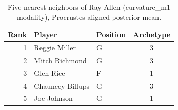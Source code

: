 \begin{table}[htbp]
  \centering\small
  \begin{tabular}{rllc}
    \toprule
    Rank & Player & Position & Archetype \\
    \midrule
    1 & Reggie Miller & G & 3 \\
    2 & Mitch Richmond & G & 3 \\
    3 & Glen Rice & F & 1 \\
    4 & Chauncey Billups & G & 3 \\
    5 & Joe Johnson & G & 1 \\
    \bottomrule
  \end{tabular}
  \caption{Five nearest neighbors of Ray Allen (curvature_m1 modality), Procrustes-aligned posterior mean.}
  \label{tab:Ray_Allen_neighbors_curvature_m1}
\end{table}

